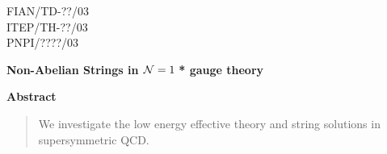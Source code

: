 \documentclass[12pt,epsf]{article}
\begin{document}
%
\newcommand{\beq}{\begin{equation}}
\newcommand{\eeq}{\end{equation}}
%
\def\beqn{\begin{eqnarray}}
\def\eeqn{\end{eqnarray}}
%
\newcommand{\qt}{\tilde q}
\newcommand{\Tr}{{\rm Tr}\,}
\newcommand{\E}{{\cal E}}
\newcommand{\qtu}{\tilde q_{1}}
\newcommand{\qtd}{\tilde q_{2}}
\newcommand{\ntwo}{${\cal N}=2\;$}
\newcommand{\none}{${\cal N}=1\;$}
\newcommand{\nfour}{${\cal N}=4\;$}
\newcommand{\vp}{\varphi}
\newcommand{\pt}{\partial}
\renewcommand{\theequation}{\thesection.\arabic{equation}}


\begin{titlepage}
\renewcommand{\thefootnote}{\fnsymbol{footnote}}











\begin{flushright}
FIAN/TD-??/03\\
ITEP/TH-??/03\\
PNPI/????/03
\end{flushright}


\vfil

\begin{center}
\baselineskip20pt
{\bf \LARGE Non-Abelian Strings in \none * gauge theory}
\end{center}
\bigskip


\begin{center}
{\large\bf Abstract} \vspace*{.2cm}
\end{center}

\begin{quotation}
We investigate the low energy effective theory and string solutions in
supersymmetric QCD.
\end{quotation}



\vfil
\end{titlepage}
\end{document}
